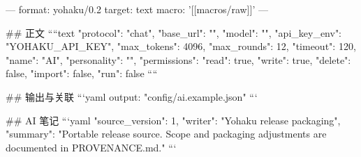 ---
format: yohaku/0.2
target: text
macro: '[[macros/raw]]'
---

## 正文
````text
{
  "protocol": "chat",
  "base_url": "",
  "model": "",
  "api_key_env": "YOHAKU_API_KEY",
  "max_tokens": 4096,
  "max_rounds": 12,
  "timeout": 120,
  "name": "AI",
  "personality": "",
  "permissions": {"read": true, "write": true, "delete": false, "import": false, "run": false}
}
````

## 输出与关联
```yaml
output: "config/ai.example.json"
```

## AI 笔记
```yaml
{"source_version": 1, "writer": "Yohaku release packaging", "summary": "Portable release source. Scope and packaging adjustments are documented in PROVENANCE.md."}
```
